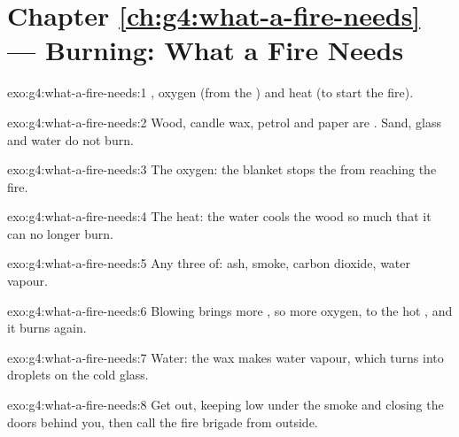 \section*{Chapter \ref{ch:g4:what-a-fire-needs} --- Burning: What a Fire Needs}

\begin{solution}{exo:g4:what-a-fire-needs:1}
, oxygen (from the ) and heat (to start the fire).
\end{solution}

\begin{solution}{exo:g4:what-a-fire-needs:2}
Wood, candle wax, petrol and paper are . Sand, glass and water do
not burn.
\end{solution}

\begin{solution}{exo:g4:what-a-fire-needs:3}
The oxygen: the blanket stops the  from reaching the fire.
\end{solution}

\begin{solution}{exo:g4:what-a-fire-needs:4}
The heat: the water cools the  wood so much that it can no
longer burn.
\end{solution}

\begin{solution}{exo:g4:what-a-fire-needs:5}
Any three of: ash, smoke, carbon dioxide, water vapour.
\end{solution}

\begin{solution}{exo:g4:what-a-fire-needs:6}
Blowing brings more , so more oxygen, to the hot , and it burns
again.
\end{solution}

\begin{solution}{exo:g4:what-a-fire-needs:7}
Water: the  wax makes water vapour, which turns into droplets on
the cold glass.
\end{solution}

\begin{solution}{exo:g4:what-a-fire-needs:8}
Get out, keeping low under the smoke and closing the doors behind you,
then call the fire brigade from outside.
\end{solution}

